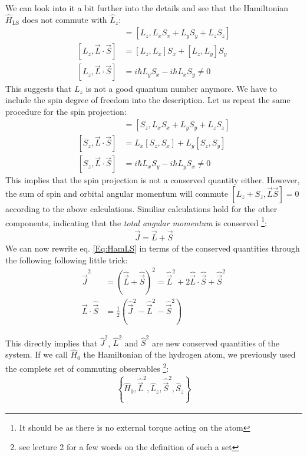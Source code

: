 \documentclass[10pt]{article}
\begin{document}
We can look into it a bit further into the details and see that the Hamiltonian $\hat{H}_\textrm{LS}$ does not commute with $\hat{L}_z$:
\begin{align}
[L_z, \vec{L}\cdot \vec{S}] &= [L_z, L_x S_x + L_y S_y + L_z S_z]\\
[L_z, \vec{L}\cdot \vec{S}] &= [L_z, L_x ]S_x + [L_z,  L_y  ]S_y\\
[L_z, \vec{L}\cdot \vec{S}] &= i\hbar L_y S_x -i\hbar L_x S_y\neq 0
\end{align}
This suggests that $L_z$ is not a good quantum number anymore. We have to include the spin degree of freedom into the description. Let us repeat the same procedure for the spin projection:
\begin{align}
[S_z, \vec{L}\cdot \vec{S}] &= [S_z, L_x S_x + L_y S_y + L_z S_z]\\
[S_z, \vec{L}\cdot \vec{S}] &= L_x [S_z,  S_x] + L_y [S_z,  S_y]\\
[S_z, \vec{L}\cdot \vec{S}] &= i\hbar L_x S_y -i\hbar L_y S_x\neq 0
\end{align}
This implies that the spin projection is not a conserved quantity either. However, the sum of spin and orbital angular momentum will commute $[L_z + S_z, \vec{L}\vec{S}] =0$ according to the above calculations. Similiar calculations hold for the other components, indicating that the \textit{total angular momentum} is conserved \footnote{It should be as there is no external torque acting on the atom}:
\begin{align}
\vec{J} = \vec{L} + \vec{S}
\end{align}
We can now rewrite eq. \eqref{Eq:HamLS} in terms of the conserved quantities through the following following little trick: 
\begin{align}
\hat{\vec{J}}^2 &= \left( \hat{\vec{L}} + \hat{\vec{S}} \right) ^2 = \hat{\vec{L}}^2 + 2 \hat{\vec{L}} \cdot \hat{\vec{S}} + \hat{\vec{S}}^2\\
\hat{\vec{L}} \cdot \hat{\vec{S}} &= \frac{1}{2} \left( \hat{\vec{J}}^2 - \hat{\vec{L}}^2 - \hat{\vec{S}}^2 \right)
\end{align}




This directly implies that $\hat{J}^2$, $\hat{L}^2$ and $\hat{S}^2$ are new conserved quantities of the system. If we call $\hat{H}_0$ the Hamiltonian of the hydrogen atom, we previously used the complete set of commuting observables \footnote{see lecture 2 for a few words on the definition of such a set }:
\begin{align}
\left\{ \hat{H}_0, \hat{\vec{L}}^2, \hat{L}_z,\hat{\vec{S}}^2, \hat{S}_z \right\}
\end{align}
\end{document}
